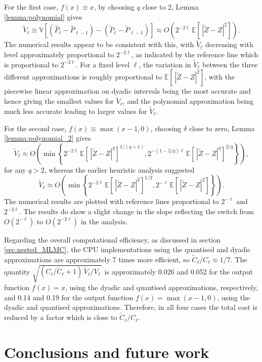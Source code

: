 \documentclass[11pt]{article}
\def \EE {{\mathbb{E}}}
\def \VV {{\mathbb{V}}}
\def \tP {{\widetilde{P}}}
\def \tZ {{\widetilde{Z}}}
\def \tC {{\widetilde{C}}}
\def \tV {{\widetilde{V}}}
\def \hP {{\widehat{P}}}
\begin{document}
For the first case, $f(x) {\equiv} x$, by choosing $q$ close to 2,
Lemma \ref{lemma:polynomial} gives
\[
\tV_\ell \equiv
\VV\left[ (\hP_\ell{-} \hP_{\ell-1}) - (\tP_\ell {-} \tP_{\ell-1}) \right]
\approx O\left( 2^{-2\ell}\, \EE[\, | \tZ{-}Z|^2 ]\right).
\]
The numerical results appear to be consistent with this, with
$\tV_\ell$ decreasing with level approximately proportional to
$2^{-2\ell}$, as indicated by the reference line which is
proportional to $2^{-2\ell}$. For a fixed level $\ell$, the
variation in $\tV_\ell$ between the three different approximations
is roughly proportional to $\EE[\, | \tZ{-}Z|^2 ]$,
with the piecewise linear approximation on dyadic intervals being
the most accurate and hence giving the smallest values for $\tV_\ell$,
and the polynomial approximation being much less accurate leading
to larger values for $\tV_\ell$.

For the second case, $f(x) {\equiv} \max(x{-}1,0)$,
choosing $\delta$ close to zero, Lemma \ref{lemma:polynomial_2} gives
\[
  \tV_\ell \approx O\left(  \min\left\{ 2^{-2\ell}\, \EE[\, | \tZ{-}Z|^q ]^{1/(q+1)},
   2^{-(1-2/q)\ell}\, \EE[\, | \tZ{-}Z|^q ]^{2/q} \right\}  \right),
\]
for any $q{>}2$, whereas the earlier heuristic analysis suggested
\[
\tV_\ell \approx O\left( \min\left\{ 2^{-2\ell}\, \EE[\, |\tZ{-}Z|^2]^{1/2},
                       2^{-\ell}\, \EE[\, |\tZ{-}Z|^2] \right\} \right).
\]
The numerical results are plotted with reference lines proportional
to $2^{-\ell}$ and $2^{-2\ell}$.  The results do show a slight change in
the slope reflecting the switch from $O(2^{-\ell})$ to $O(2^{-2\ell})$
in the analysis.

Regarding the overall computational efficiency, as discussed in section
\ref{sec:nested_MLMC}, the CPU implementations using the quantised and
dyadic approximations are approximately 7 times more efficient, so
$\tC_\ell/C_\ell \approx 1/7$.  The quantity
$\sqrt{(C_\ell/\tC_\ell + 1)\, \tV_\ell/V_\ell \,}$ is approximately
0.026 and 0.052 for the output function $f(x){=}x$, using the dyadic and
quantised approximations, respectively, and
0.14 and 0.19 for the output function $f(x){=}\max(x{-}1,0)$, using the
dyadic and quantised approximations. Therefore, in all four cases
the total cost is reduced by a factor which is close to $\tC_\ell/C_\ell$.


\section{Conclusions and future work}
\end{document}
